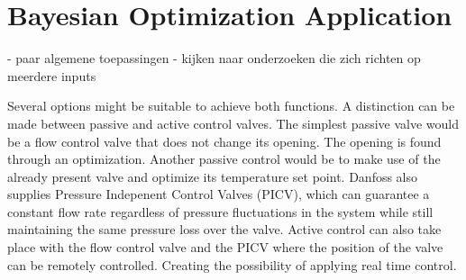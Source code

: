 \section{Bayesian Optimization Application}
- paar algemene toepassingen
- kijken naar onderzoeken die zich richten op meerdere inputs



Several options might be suitable to achieve both functions. A distinction can be made between passive and active control valves. The simplest passive valve would be a flow control valve that does not change its opening. The opening is found through an optimization. Another passive control would be to make use of the already present valve and optimize its temperature set point. Danfoss also supplies Pressure Indepenent Control Valves (PICV), which can guarantee a constant flow rate regardless of pressure fluctuations in the system while still maintaining the same pressure loss over the valve. Active control can also take place with the flow control valve and the PICV where the position of the valve can be remotely controlled. Creating the possibility of applying real time control.  